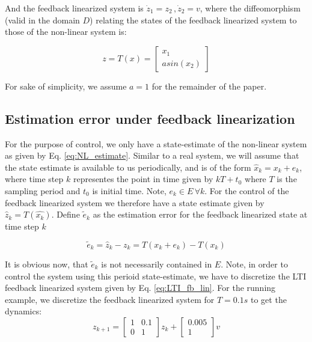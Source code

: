 And the feedback linearized system is $\dot{z}_1 = z_2\, ,\dot{z}_2 = v$, where the diffeomorphism (valid in the domain $D$) relating the states of the feedback linearized system to those of the non-linear system is:

\begin{equation}
z = T(x) = \begin{bmatrix} x_1 \\ asin(x_2) \end{bmatrix}
\end{equation}

For sake of simplicity, we assume $a=1$ for the remainder of the paper.

\subsection{Estimation error under feedback linearization}
\label{sec:EstErrFbLin}
For the purpose of control, we only have a state-estimate of the non-linear system as given by Eq. \ref{eq:NL_estimate}. Similar to a real system, we will assume that the state estimate is available to us periodically, and is of the form $\hat{x}_k = x_k + e_k$, where time step $k$ representes the point in time given by $kT+t_0$ where $T$ is the sampling period and $t_0$ is initial time. Note, $e_k \in E \, \forall k$. For the control of the feedback linearized system we therefore have a state estimate given by $\hat{z}_k = T(\hat{x_k})$. Define $\tilde{e}_k$ as the estimation error for the feedback linearized state at time step $k$

\begin{equation}
\label{eq:NLesterr}
\tilde{e}_k =\hat{z}_k - z_k =  T(x_k + e_k) - T(x_k)
\end{equation}

It is obvious now, that $\tilde{e}_k$ is not necessarily contained in  $E$. Note, in order to control the system using this perioid state-estimate, we have to discretize the LTI feedback linearized system given by Eq. \ref{eq:LTI_fb_lin}. For the running example, we discretize the feedback linearized system for $T=0.1s$ to get the dynamics:
\begin{equation}
\label{toy_dt}
z_{k+1} = \begin{bmatrix} 1 & 0.1 \\ 0 & 1 \end{bmatrix} z_k + \begin{bmatrix} 0.005 \\ 1 \end{bmatrix}v
\end{equation}

